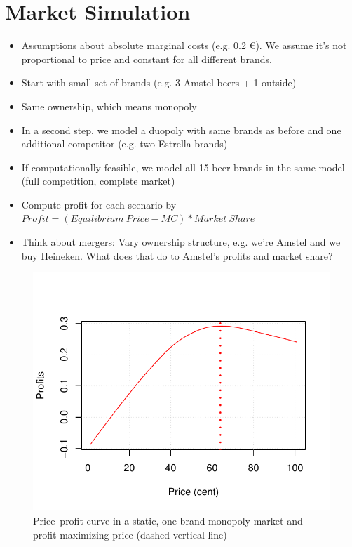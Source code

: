 \documentclass[12pt,a4paper]{article}
\begin{document}
\section{Market Simulation} \label{sec_marketsim}
\begin{itemize}
\item Assumptions about absolute marginal costs (e.g. 0.2 \euro). We assume it's not proportional to price and constant for all different brands.
\item Start with small set of brands (e.g. 3 Amstel beers + 1 outside)
\item Same ownership, which means monopoly
\item In a second step, we model a duopoly with same brands as before and one additional competitor (e.g. two Estrella brands)
\item If computationally feasible, we model all 15 beer brands in the same model (full competition, complete market)
\item Compute profit for each scenario by\\
 $Profit = (Equilibrium\ Price - MC)* Market\ Share$
\item Think about mergers: Vary ownership structure, e.g. we're Amstel and we buy Heineken. What does that do to Amstel's profits and market share?
\end{itemize}

\begin{figure}[ht]
	\centering
  \includegraphics[scale = 0.7]{figures/opt_price_one_brand_static_monopoly.pdf}
	\caption{Price--profit curve in a static, one-brand monopoly market and profit-maximizing price (dashed vertical line)}
	\label{fig_opt_monopoly}
\end{figure}
\end{document}
